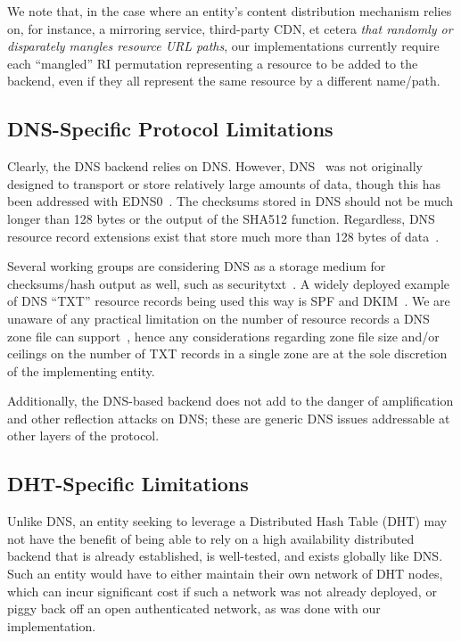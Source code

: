 We note that, in the case where an entity's content distribution mechanism
relies on, for instance, a mirroring service, third-party CDN, et cetera
\emph{that randomly or disparately mangles resource URL paths}, our
implementations currently require each ``mangled'' RI permutation representing a
resource to be added to the backend, even if they all represent the same
resource by a different name/path.

\subsection{DNS-Specific Protocol Limitations}

Clearly, the DNS backend relies on DNS. However, DNS~\cite{DNS1} was not
originally designed to transport or store relatively large amounts of data,
though this has been addressed with EDNS0~\cite{EDNS}. The checksums stored in
DNS should not be much longer than 128 bytes or the output of the SHA512
function. Regardless, DNS resource record extensions exist that store much more
than 128 bytes of data~\cite{CERT, IPSECKEY, DANE3, DANE1}.

Several working groups are considering DNS as a storage medium for
checksums/hash output as well, such as securitytxt~\cite{draft-sectxt}. A widely
deployed example of DNS ``TXT'' resource records being used this way is SPF and
DKIM~\cite{DKIM}. We are unaware of any practical limitation on the number of
resource records a DNS zone file can support~\cite{DNS1}, hence any
considerations regarding zone file size and/or ceilings on the number of TXT
records in a single zone are at the sole discretion of the implementing entity.

Additionally, the DNS-based backend does not add to the danger of amplification
and other reflection attacks on DNS; these are generic DNS issues addressable at
other layers of the protocol.


\subsection{DHT-Specific Limitations}

Unlike DNS, an entity seeking to leverage a Distributed Hash Table (DHT) may not
have the benefit of being able to rely on a high availability distributed
backend that is already established, is well-tested, and exists
globally like DNS. Such an entity would have to either maintain their own
network of DHT nodes, which can incur significant cost if such a network was not
already deployed, or piggy back off an open authenticated network, as was done
with our implementation.

